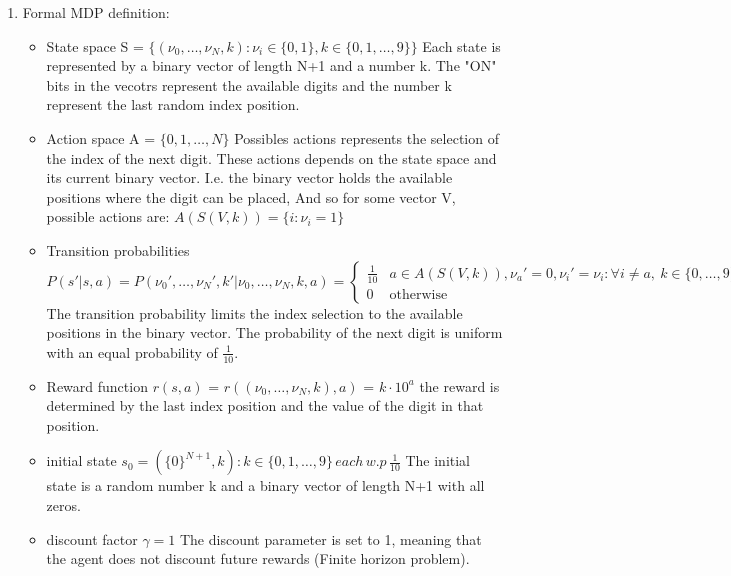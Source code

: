 \documentclass{assignmeownt}
\begin{document}
\begin{enumerate} %
\item Formal MDP definition:
\newline
\begin{itemize}

\item State space
S = $\{(\nu_0, \dots, \nu_{N}, k) : \nu_i \in \{0, 1\}, k \in \{0, 1,  \dots, 9\}\}$
\newline
Each state is represented by a binary vector of length N+1 and a number k. The "ON" bits in the vecotrs represent the available digits and the number k represent the last random index position.
\newline

\item Action space
A = $\{0, 1, \dots, N\}$
\newline
Possibles actions represents the selection of the index of the next digit. These actions depends on the state space and its current binary vector.
\newline
I.e. the binary vector holds the available positions where the digit can be placed, And so for some vector V, possible actions are: $A(S(V, k)) = \{i : \nu_i = 1\}$

\item Transition probabilities
\newline
$$
P(s' | s, a) = P(\nu_0', \dots, \nu_{N}', k' | \nu_0, \dots, \nu_{N}, k, a) = 
\begin{cases} 
\frac{1}{10} &  a \in A(S(V, k)), \nu_{a}'=0, \nu_{i}'=\nu_{i} : \forall{i}\neq{a},\ k \in\{0, \dots, 9\}   \\
0 & \text{otherwise}
\end{cases}
$$
\newline
The transition probability limits the index selection to the available positions in the binary vector. The probability of the next digit is uniform with an equal probability of $\frac{1}{10}$.

\item Reward function $r(s, a)$ = $r((\nu_0, \dots, \nu_{N}, k), a)$ = $ k \cdot{10^a} $
\newline
the reward is determined by the last index position and the value of the digit in that position.

\item initial state $s_0 = (\{0\}^{N+1}, k): k \in \{0, 1, \dots, 9\} \, each \, w.p \, \frac{1}{10}$
\newline
The initial state is a random number k and a binary vector of length N+1 with all zeros.
\item discount factor $\gamma = 1$
\newline
The discount parameter is set to 1, meaning that the agent does not discount future rewards (Finite horizon problem).


\end{itemize}


\end{enumerate} %

\end{document}
